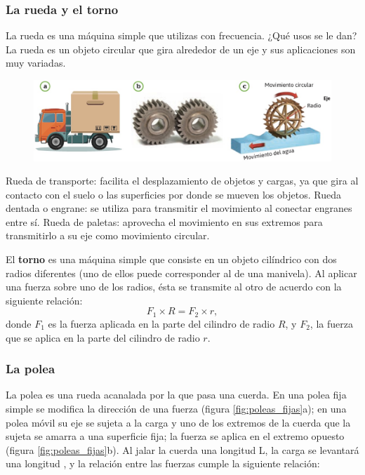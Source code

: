 \documentclass[11pt]{book}
\begin{document}
\newpage

\subsubsection{La rueda y el torno}

La rueda es una máquina simple que utilizas con frecuencia.
¿Qué usos se le dan? La rueda es un objeto circular que gira alrededor de un
eje y sus aplicaciones son muy variadas.\\

\begin{figure}[H]
  \centering
  \includegraphics[width=0.9\linewidth]{ruedas01.jpg}
  \label{fig:ruedas01}
\end{figure}

Rueda de transporte: facilita el desplazamiento de objetos y cargas,
ya que gira al contacto con el suelo o las superficies por donde se
mueven los objetos.
Rueda dentada o engrane: se utiliza para transmitir
el movimiento al conectar engranes entre sí.
Rueda de paletas: aprovecha el movimiento en sus extremos para transmitirlo
a su eje como movimiento circular.

El \textbf{torno} es una máquina simple que consiste en un objeto cilíndrico
con dos radios diferentes (uno de ellos puede corresponder al de una manivela).
Al aplicar una fuerza sobre uno de los radios, ésta se transmite al otro de acuerdo
con la siguiente relación:\\

\begin{equation}
  F_1 \times R= F_2 \times r,
\end{equation}
donde $F_1$ es la fuerza aplicada en la parte del cilindro de radio $R$, y $F_2$,
la fuerza que se aplica en la parte del cilindro de radio $r$.

\newpage
\subsubsection{La polea}
La polea es una rueda acanalada por la que pasa una cuerda. En una polea fija simple
se modifica la dirección de una fuerza (figura \ref{fig:poleas_fijas}a); en una polea móvil su eje se
sujeta a la carga y uno de los extremos de la cuerda que la sujeta se amarra a una
superficie fija; la fuerza se aplica en el extremo opuesto (figura \ref{fig:poleas_fijas}b).
Al jalar la cuerda una longitud L, la carga se levantará una longitud ,
y la relación entre las fuerzas cumple la siguiente relación:
\end{document}
